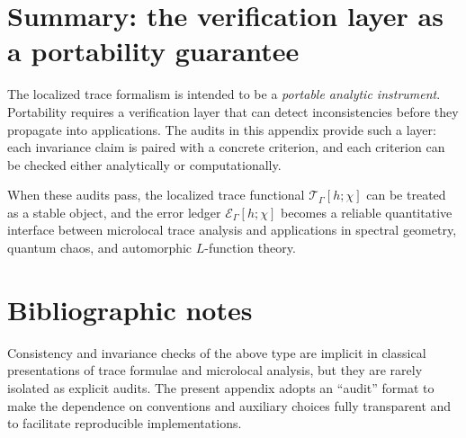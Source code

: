 \section{Summary: the verification layer as a portability guarantee}
\label{sec:E.summary}

The localized trace formalism is intended to be a \emph{portable analytic instrument}.  Portability requires a
verification layer that can detect inconsistencies before they propagate into applications.
The audits in this appendix provide such a layer: each invariance claim is paired with a concrete criterion, and each
criterion can be checked either analytically or computationally.

When these audits pass, the localized trace functional $\mathcal{T}_\Gamma[h;\chi]$ can be treated as a stable object,
and the error ledger $\mathcal{E}_\Gamma[h;\chi]$ becomes a reliable quantitative interface between microlocal trace
analysis and applications in spectral geometry, quantum chaos, and automorphic $L$-function theory.

\section*{Bibliographic notes}

Consistency and invariance checks of the above type are implicit in classical presentations of trace formulae and
microlocal analysis, but they are rarely isolated as explicit audits.
The present appendix adopts an ``audit'' format to make the dependence on conventions and auxiliary choices fully
transparent and to facilitate reproducible implementations.

